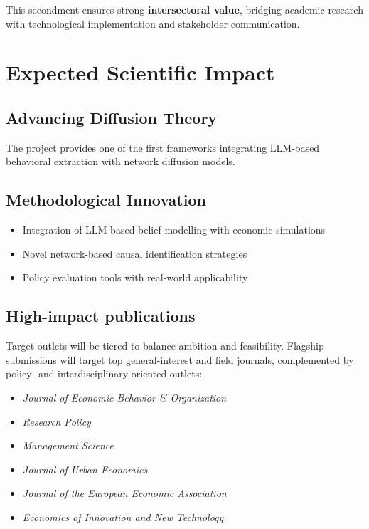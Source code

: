 \documentclass{nfr}
\begin{document}
This secondment ensures strong \textbf{intersectoral value}, bridging academic research with technological implementation and stakeholder communication.

\section{Expected Scientific Impact}

\subsection{Advancing Diffusion Theory}

The project provides one of the first frameworks integrating LLM-based behavioral extraction with network diffusion models.

\subsection{Methodological Innovation}

\begin{itemize}
\item Integration of LLM-based belief modelling with economic simulations
\item Novel network-based causal identification strategies
\item Policy evaluation tools with real-world applicability
\end{itemize}

\subsection{High-impact publications}

Target outlets will be tiered to balance ambition and feasibility. Flagship submissions will target top general-interest and field journals, complemented by policy- and interdisciplinary-oriented outlets:

\begin{itemize}
\item \emph{Journal of Economic Behavior \& Organization}
\item \emph{Research Policy}
\item \emph{Management Science}
\item \emph{Journal of Urban Economics}
\item \emph{Journal of the European Economic Association}
\item \emph{Economics of Innovation and New Technology}
\end{itemize}
\end{document}
